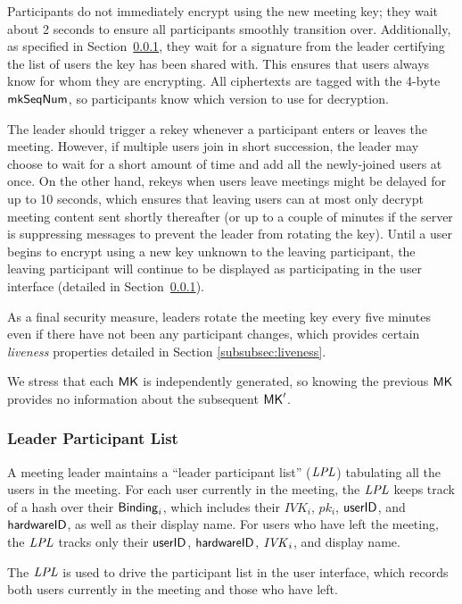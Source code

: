 Participants do not immediately encrypt using the new meeting key; they wait about 2 seconds to
ensure all participants smoothly transition over. Additionally, as specified in
Section~\ref{subsubsec:lpl}, they wait for a signature from the leader certifying the list of users
the key has been shared with. This ensures that users always know for whom they are encrypting. All
ciphertexts are tagged with the 4-byte $\mathsf{mkSeqNum}$, so participants know which version to
use for decryption.

The leader should trigger a rekey whenever a participant enters or leaves the meeting. However, if
multiple users join in short succession, the leader may choose to wait for a short amount of time
and add all the newly-joined users at once. On the other hand, rekeys when users leave meetings
might be delayed for up to 10 seconds, which ensures that leaving users can at most only decrypt
meeting content sent shortly thereafter (or up to a couple of minutes if the server is suppressing
messages to prevent the leader from rotating the key). Until a user begins to encrypt using a new
key unknown to the leaving participant, the leaving participant will continue to be displayed as
participating in the user interface (detailed in Section~\ref{subsubsec:lpl}).

As a final security measure, leaders rotate the meeting key every five minutes even if there have
not been any participant changes, which provides certain \textit{liveness} properties detailed in
Section \ref{subsubsec:liveness}.

We stress that each ${\sf MK}$ is independently generated, so knowing the previous ${\sf MK}$ provides no
information about the subsequent ${\sf MK}'$.

\subsubsection{Leader Participant List}\label{subsubsec:lpl} A meeting leader maintains a ``leader
participant list'' ($\mathit{LPL}$) tabulating all the users in the meeting. For each user currently in the
meeting, the $\mathit{LPL}$ keeps track of a hash over their ${\sf Binding}_i$, which includes their $IVK_i$,
$pk_i$, $\mathsf{userID}$, and ${\sf hardwareID}$, as well as their display name. For users who have left the
meeting, the $\mathit{LPL}$ tracks only their $\mathsf{userID}$, ${\sf hardwareID}$, $\mathit{IVK}_i$, and display name.

The $\mathit{LPL}$ is used to drive the participant list in the user interface, which records both users
currently in the meeting and those who have left.

